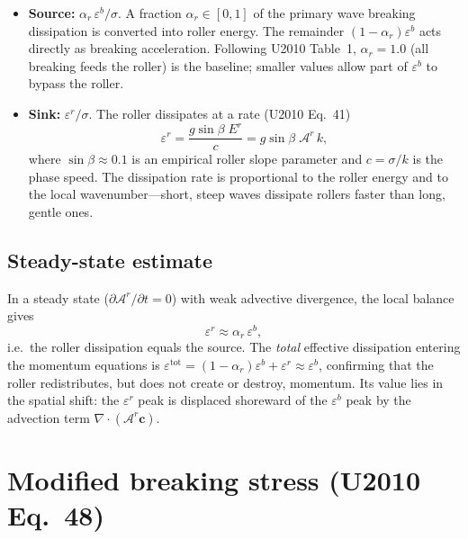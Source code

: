 \documentclass[11pt]{article}
\begin{document}
\begin{itemize}
\item \textbf{Source:} $\alpha_r\,\varepsilon^b/\sigma$. A fraction
  $\alpha_r \in [0,1]$ of the primary wave breaking dissipation is converted
  into roller energy. The remainder $(1-\alpha_r)\varepsilon^b$ acts
  directly as breaking acceleration. Following U2010 Table~1,
  $\alpha_r = 1.0$ (all breaking feeds the roller) is the baseline; smaller
  values allow part of $\varepsilon^b$ to bypass the roller.

\item \textbf{Sink:} $\varepsilon^r/\sigma$. The roller dissipates at a rate
  (U2010 Eq.~41)
  \begin{equation}
    \varepsilon^r = \frac{g\sin\beta\;E^r}{c}
                  = g\sin\beta\;\mathscr{A}^r\,k,
    \label{eq:roller_dissip}
  \end{equation}
  where $\sin\beta \approx 0.1$ is an empirical roller slope parameter and
  $c = \sigma/k$ is the phase speed. The dissipation rate is proportional to
  the roller energy and to the local wavenumber---short, steep waves dissipate
  rollers faster than long, gentle ones.
\end{itemize}

\subsection*{Steady-state estimate}

In a steady state ($\partial\mathscr{A}^r/\partial t = 0$) with weak
advective divergence, the local balance gives
\begin{equation}
  \varepsilon^r \approx \alpha_r\,\varepsilon^b,
\end{equation}
i.e.\ the roller dissipation equals the source. The \emph{total} effective
dissipation entering the momentum equations is
$\varepsilon^{\mathrm{tot}} = (1-\alpha_r)\varepsilon^b + \varepsilon^r
\approx \varepsilon^b$, confirming that the roller redistributes, but does
not create or destroy, momentum. Its value lies in the spatial shift: the
$\varepsilon^r$ peak is displaced shoreward of the $\varepsilon^b$ peak by
the advection term $\nabla\!\cdot(\mathscr{A}^r \mathbf{c})$.

\section{Modified breaking stress (U2010 Eq.~48)}
\end{document}
